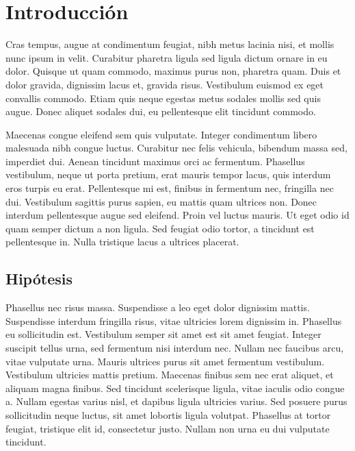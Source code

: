 \chapter{Introducción}

Cras tempus, augue at condimentum feugiat, nibh metus lacinia nisi, et mollis nunc ipsum in velit. Curabitur pharetra ligula sed ligula dictum ornare in eu dolor. Quisque ut quam commodo, maximus purus non, pharetra quam. Duis et dolor gravida, dignissim lacus et, gravida risus. Vestibulum euismod ex eget convallis commodo. Etiam quis neque egestas metus sodales mollis sed quis augue. Donec aliquet sodales dui, eu pellentesque elit tincidunt commodo.

Maecenas congue eleifend sem quis vulputate. Integer condimentum libero malesuada nibh congue luctus. Curabitur nec felis vehicula, bibendum massa sed, imperdiet dui. Aenean tincidunt maximus orci ac fermentum. Phasellus vestibulum, neque ut porta pretium, erat mauris tempor lacus, quis interdum eros turpis eu erat. Pellentesque mi est, finibus in fermentum nec, fringilla nec dui. Vestibulum sagittis purus sapien, eu mattis quam ultrices non. Donec interdum pellentesque augue sed eleifend. Proin vel luctus mauris. Ut eget odio id quam semper dictum a non ligula. Sed feugiat odio tortor, a tincidunt est pellentesque in. Nulla tristique lacus a ultrices placerat.


\section{Hipótesis}
Phasellus nec risus massa. Suspendisse a leo eget dolor dignissim mattis. Suspendisse interdum fringilla risus, vitae ultricies lorem dignissim in. Phasellus eu sollicitudin est. Vestibulum semper sit amet est sit amet feugiat. Integer suscipit tellus urna, sed fermentum nisi interdum nec. Nullam nec faucibus arcu, vitae vulputate urna. Mauris ultrices purus sit amet fermentum vestibulum. Vestibulum ultricies mattis pretium. Maecenas finibus sem nec erat aliquet, et aliquam magna finibus. Sed tincidunt scelerisque ligula, vitae iaculis odio congue a. Nullam egestas varius nisl, et dapibus ligula ultricies varius. Sed posuere purus sollicitudin neque luctus, sit amet lobortis ligula volutpat. Phasellus at tortor feugiat, tristique elit id, consectetur justo. Nullam non urna eu dui vulputate tincidunt.



